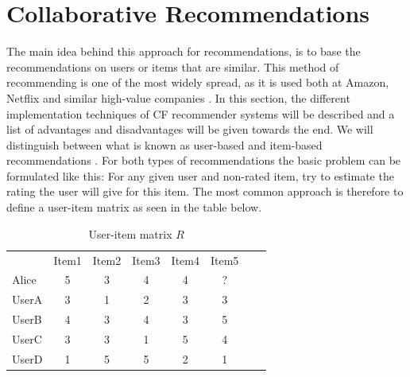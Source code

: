 \section{Collaborative Recommendations}
\label{sec:collaborative}
The main idea behind this approach for recommendations, is to base the recommendations on users or items that are similar.\newline
This method of recommending is one of the most widely spread, as it is used both at Amazon, Netflix and similar high-value companies \citep{AmazonRecommendations}.\newline
In this section, the different implementation techniques of CF recommender systems will be described and a list of advantages and disadvantages will be given towards the end. We will distinguish between what is known as user-based and item-based recommendations \citep{IntroductionRecommenderSystems}.\newline
For both types of recommendations the basic problem can be formulated like this: For any given user and non-rated item, try to estimate the rating the user will give for this item.\newline
The most common approach is therefore to define a user-item matrix as seen in the table below.


\begin{table}[H]
\begin{center}
\begin{tabular}{l c c c c c c r }
  & Item1 & Item2 & Item3 & Item4 & Item5 \\ 
 Alice & 5 & 3 & 4 & 4 & ? \\
 UserA & 3 & 1 & 2 & 3 & 3 \\
 UserB & 4 & 3 & 4 & 3 & 5 \\
 UserC & 3 & 3 & 1 & 5 & 4 \\
 UserD & 1 & 5 & 5 & 2 & 1
\end{tabular}
\caption{User-item matrix \(R\)}
\label{tableofratings} 
\end{center}
\end{table}

